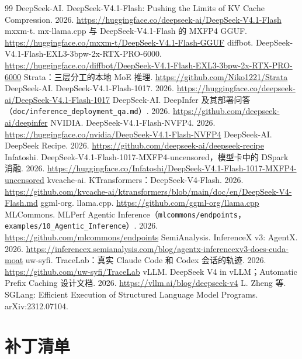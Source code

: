 \documentclass[11pt,a4paper]{article}
\newcommand{\code}[1]{\texttt{#1}}
\begin{document}
\begin{thebibliography}{99}
 DeepSeek-AI. DeepSeek-V4.1-Flash: Pushing the Limits of KV Cache Compression. 2026. \url{https://huggingface.co/deepseek-ai/DeepSeek-V4.1-Flash}
 mxxm-t. mx-llama.cpp 与 DeepSeek-V4.1-Flash 的 MXFP4 GGUF. \url{https://huggingface.co/mxxm-t/DeepSeek-V4.1-Flash-GGUF}
 diffbot. DeepSeek-V4.1-Flash-EXL3-3bpw-2x-RTX-PRO-6000. \url{https://huggingface.co/diffbot/DeepSeek-V4.1-Flash-EXL3-3bpw-2x-RTX-PRO-6000}
 Strata：三层分工的本地 MoE 推理. \url{https://github.com/Niko1221/Strata}
 DeepSeek-AI. DeepSeek-V4.1-Flash-1017. 2026. \url{https://huggingface.co/deepseek-ai/DeepSeek-V4.1-Flash-1017}
 DeepSeek-AI. DeepInfer 及其部署问答（\code{doc/inference\_deployment\_qa.md}）. 2026. \url{https://github.com/deepseek-ai/deepinfer}
 NVIDIA. DeepSeek-V4.1-Flash-NVFP4. 2026. \url{https://huggingface.co/nvidia/DeepSeek-V4.1-Flash-NVFP4}
 DeepSeek-AI. DeepSeek Recipe. 2026. \url{https://github.com/deepseek-ai/deepseek-recipe}
 Infatoshi. DeepSeek-V4.1-Flash-1017-MXFP4-uncensored，模型卡中的 DSpark 消融. 2026. \url{https://huggingface.co/Infatoshi/DeepSeek-V4.1-Flash-1017-MXFP4-uncensored}
 kvcache-ai. KTransformers：DeepSeek-V4-Flash. 2026. \url{https://github.com/kvcache-ai/ktransformers/blob/main/doc/en/DeepSeek-V4-Flash.md}
 ggml-org. llama.cpp. \url{https://github.com/ggml-org/llama.cpp}
 MLCommons. MLPerf Agentic Inference（\code{mlcommons/endpoints}，\code{examples/10\_Agentic\_Inference}）. 2026. \url{https://github.com/mlcommons/endpoints}
 SemiAnalysis. InferenceX v3: AgentX. 2026. \url{https://inferencex.semianalysis.com/blog/agentx-inferencexv3-does-cuda-moat}
 uw-syfi. TraceLab：真实 Claude Code 和 Codex 会话的轨迹. 2026. \url{https://github.com/uw-syfi/TraceLab}
 vLLM. DeepSeek V4 in vLLM；Automatic Prefix Caching 设计文档. 2026. \url{https://vllm.ai/blog/deepseek-v4}
 L. Zheng 等. SGLang: Efficient Execution of Structured Language Model Programs. arXiv:2312.07104.
\end{thebibliography}

\newpage
\appendix

\section{补丁清单}
\end{document}
